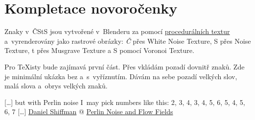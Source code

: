 \section{Kompletace novoročenky}

Znaky v~ČStS jsou vytvořené v~Blenderu za pomocí 
\href{https://docs.blender.org/manual/en/latest/render/shader_nodes/textures/index.html}{procedurálních textur} 
a~vyrenderovány jako rastrové obrázky: 
{\ttfamily\itshape Č} přes White Noise Texture,
{\malfontc S} přes Noise Texture, %
{\malfontc t} přes Musgrave Texture a %
{\malfontc S} pomocí Voronoi Texture. %

Pro \TeX isty bude zajímavá první část. Přes \maltikz{} vkládám pozadí dovnitř znaků. Zde je minimální ukázka  bez a~s~vyříznutím. Dávám na sebe pozadí velkých slov, malá slova a~obrys velkých znaků.



\noindent
{}



\vfil

\hfill [\ldots] but with Perlin noise I~may pick numbers like this: 2, 3, 4, 3, 4, 5, 6, 5, 4, 5, 6, 7 [\ldots]\hfill
\href{https://www.youtube.com/channel/UCvjgXvBlbQiydffZU7m1_aw}{Daniel Shiffman} 
@ 
\href{https://www.youtube.com/watch?v=sor1nwNIP9A&feature=youtu.be&t=29m40s}{Perlin Noise and Flow Fields}


